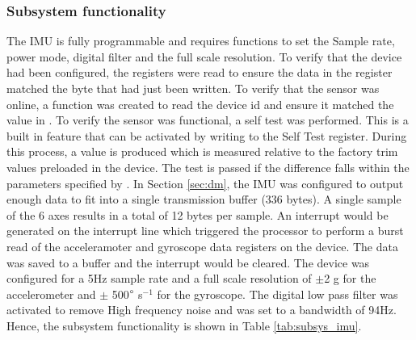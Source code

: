 \begin{table}[H]
	\centering
	\caption{Baseline functionality of the Iridium UART communication peripheral of the firmware and the test used to verify unit functionality.}
	\label{tab:base_imu}
	\setlength{\extrarowheight}{5pt}
\end{table}

\subsubsection{Subsystem functionality}
The IMU is fully programmable and requires functions to set the Sample rate, power mode, digital filter and the full scale resolution. To verify that the device had been configured, the registers were read to ensure the data in the register matched the byte that had just been written. To verify that the sensor was online, a function was created to read the device id and ensure it matched the value in \textcite{mpu6050}. To verify the sensor was functional, a self test was performed. This is a built in feature that can be activated by writing to the Self Test register. During this process, a value is produced which is measured relative to the factory trim values preloaded in the device. The test is passed if the difference falls within the parameters specified by \textcite{mpu6050}. In Section \ref{sec:dm}, the IMU was configured to output enough data to fit into a single transmission buffer (336 bytes). A single sample of the 6 axes results in a total of 12 bytes per sample. An interrupt would be generated on the interrupt line which triggered the processor to perform a burst read of the acceleramoter and gyroscope data registers on the device. The data was saved to a buffer and the interrupt would be cleared. The device was configured for a 5Hz sample rate and a full scale resolution of $\pm$2 g for the accelerometer and $\pm$ 500$\degree$ s$^{-1}$  for the gyroscope. The digital low pass filter was activated to remove High frequency noise and was set to a bandwidth of 94Hz. Hence, the subsystem functionality is shown in Table \ref{tab:subsys_imu}. 

